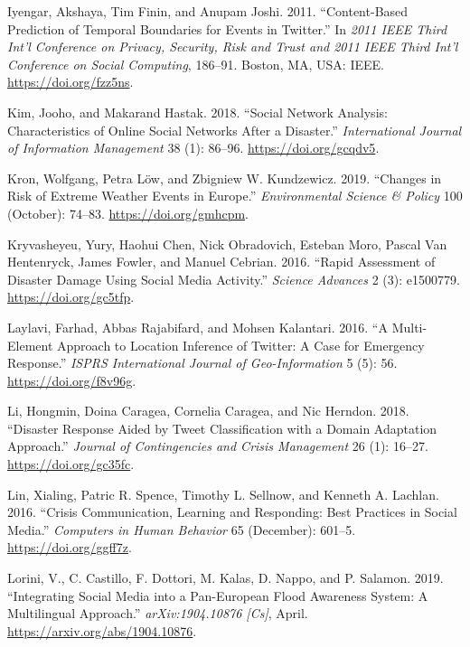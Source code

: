 \documentclass[a4paper, notitlepage]{extreport}
\newlength{\cslhangindent}
\newenvironment{CSLReferences}[2] %
 {%
  \setlength{\parindent}{0pt}
  \ifodd #1 \everypar{\setlength{\hangindent}{\cslhangindent}}\ignorespaces\fi
  \ifnum #2 > 0
  \setlength{\parskip}{#2\baselineskip}
  \fi
 }%
 {}
\begin{document}
\begin{CSLReferences}{1}{0}
\leavevmode{}%
Iyengar, Akshaya, Tim Finin, and Anupam Joshi. 2011. {``Content-{Based
Prediction} of {Temporal Boundaries} for {Events} in {Twitter}.''} In
\emph{2011 {IEEE Third Int}'l {Conference} on {Privacy}, {Security},
{Risk} and {Trust} and 2011 {IEEE Third Int}'l {Conference} on {Social
Computing}}, 186--91. {Boston, MA, USA}: {IEEE}.
\url{https://doi.org/fzz5ns}.

\leavevmode{}%
Kim, Jooho, and Makarand Hastak. 2018. {``Social Network Analysis:
{Characteristics} of Online Social Networks After a Disaster.''}
\emph{International Journal of Information Management} 38 (1): 86--96.
\url{https://doi.org/gcqdv5}.

\leavevmode{}%
Kron, Wolfgang, Petra Löw, and Zbigniew W. Kundzewicz. 2019. {``Changes
in Risk of Extreme Weather Events in {Europe}.''} \emph{Environmental
Science \& Policy} 100 (October): 74--83. \url{https://doi.org/gmhcpm}.

\leavevmode{}%
Kryvasheyeu, Yury, Haohui Chen, Nick Obradovich, Esteban Moro, Pascal
Van Hentenryck, James Fowler, and Manuel Cebrian. 2016. {``Rapid
Assessment of Disaster Damage Using Social Media Activity.''}
\emph{Science Advances} 2 (3): e1500779. \url{https://doi.org/gc5tfp}.

\leavevmode{}%
Laylavi, Farhad, Abbas Rajabifard, and Mohsen Kalantari. 2016. {``A
{Multi}-{Element Approach} to {Location Inference} of {Twitter}: {A
Case} for {Emergency Response}.''} \emph{ISPRS International Journal of
Geo-Information} 5 (5): 56. \url{https://doi.org/f8v96g}.

\leavevmode{}%
Li, Hongmin, Doina Caragea, Cornelia Caragea, and Nic Herndon. 2018.
{``Disaster Response Aided by Tweet Classification with a Domain
Adaptation Approach.''} \emph{Journal of Contingencies and Crisis
Management} 26 (1): 16--27. \url{https://doi.org/gc35fc}.

\leavevmode{}%
Lin, Xialing, Patric R. Spence, Timothy L. Sellnow, and Kenneth A.
Lachlan. 2016. {``Crisis Communication, Learning and Responding: {Best}
Practices in Social Media.''} \emph{Computers in Human Behavior} 65
(December): 601--5. \url{https://doi.org/ggff7z}.

\leavevmode{}%
Lorini, V., C. Castillo, F. Dottori, M. Kalas, D. Nappo, and P. Salamon.
2019. {``Integrating {Social Media} into a {Pan}-{European Flood
Awareness System}: {A Multilingual Approach}.''} \emph{arXiv:1904.10876
{[}Cs{]}}, April. \url{https://arxiv.org/abs/1904.10876}.


\end{CSLReferences}
\end{document}
